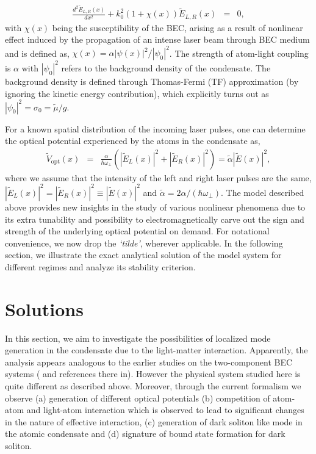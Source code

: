 \documentclass[epj]{svjour}
\begin{document}
\begin{eqnarray}
\frac{d^2\tilde{E}_{L,R}(x)}{dx^2}+k_0^2 (1+\chi(x))\tilde{E}_{L,R}(x)&=&0,\label{helmoltz}
\end{eqnarray}
with $\chi(x)$ being the susceptibility of the BEC, arising as a result of nonlinear effect induced by the propagation of an intense laser beam through BEC medium and is defined as, $\chi(x)=\alpha |\psi(x)|^2/|\psi_0|^2$. The strength of atom-light coupling is $\alpha$ with $|\psi_0|^2$ refers to the background density of the condensate. The background density is defined through Thomas-Fermi (TF) approximation (by ignoring the kinetic energy contribution), which explicitly turns out as $|\psi_0|^2=\sigma_0=\tilde{\mu}/g$.




For a known spatial distribution of the incoming laser pulses, one can determine the optical potential experienced by the atoms in the condensate as,
\begin{eqnarray}
\tilde{V}_{\mathrm{opt}}(x) &=&  \frac{\alpha}{\hbar\omega_{\perp}} \left(|\tilde{E}_L(x)|^2+|\tilde{E}_R(x)|^2\right) = \tilde{\alpha} |\tilde{E}(x)|^2,
\end{eqnarray}
where we assume that the intensity of the left and right laser pulses are the same, $|\tilde{E}_L(x)|^2 = |\tilde{E}_R(x)|^2 \equiv |\tilde{E}(x)|^2$ and $\tilde{\alpha} = 2\alpha / (\hbar\omega_{\perp})$. The model described above provides new insights in the study of various nonlinear phenomena due to its extra tunability and possibility to electromagnetically carve out the sign and strength of the underlying optical potential on demand. For notational convenience, we now drop the {\it `tilde'}, wherever applicable. In the following section, we illustrate the exact analytical solution of the model system for different regimes and analyze its stability criterion.

\section{Solutions}\label{solu}


In this section, we aim to investigate the possibilities of localized mode generation in the condensate due to the light-matter interaction. Apparently, the analysis appears analogous to the earlier studies on the two-component BEC systems (\cite{kevre,das1} and references there in). However the physical system studied here is quite different as described above. Moreover, through the current formalism we observe (a) generation of different optical potentials (b) competition of atom-atom and light-atom interaction which is observed to lead to significant changes in the nature of effective interaction, (c) generation of dark soliton like mode in the atomic condensate and (d) signature of bound state formation for dark soliton.
\end{document}
